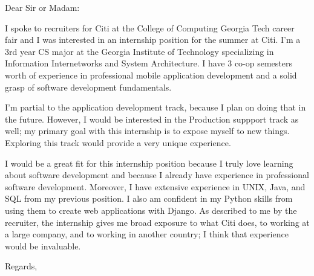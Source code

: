 \documentclass{letter}
\begin{document}
\begin{letter}{}
\opening{Dear Sir or Madam:}

I spoke to recruiters for Citi at the College of Computing Georgia Tech career fair and I was interested in an internship position for the summer at Citi. I'm a 3rd year CS major at the Georgia Institute of Technology specializing in Information Internetworks and System Architecture. I have 3 co-op semesters worth of experience in professional mobile application development and a solid grasp of software development fundamentals. 

I'm partial to the application development track, because I plan on doing that in the future. However, I would be interested in the Production suppport track as well; my primary goal with this internship is to expose myself to new things. Exploring this track would provide a very unique experience.

I would be a great fit for this internship position because I truly love learning about software development and because I already have experience in professional software development. Moreover, I have extensive experience in UNIX, Java, and SQL from my previous position. I also am confident in my Python skills from using them to create web applications with Django. As described to me by the recruiter, the internship gives me broad exposure to what Citi does, to working at a large company, and to working in another country; I think that experience would be invaluable.


\closing{Regards,}
\end{letter}
\end{document}
